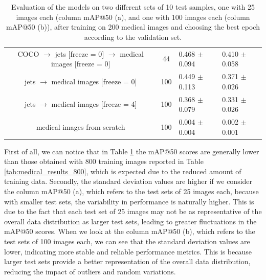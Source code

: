\begin{table}[!ht]
{\begin{tabular}{|ccll|}
    \multicolumn{1}{|c|}{{\color[HTML]{643403} COCO $\to$ jets {[}freeze = 0{]} $\to$ medical images {[}freeze = 0{]}}} & \multicolumn{1}{c|}{{\color[HTML]{643403} 44}}  & \multicolumn{1}{l|}{{\color[HTML]{643403} 0.468 $\pm$ 0.094}} & {\color[HTML]{643403} 0.410 $\pm$ 0.058} \\
    \multicolumn{1}{|c|}{{\color[HTML]{F171DF} jets $\to$ medical images {[}freeze = 0{]}}}                             & \multicolumn{1}{c|}{{\color[HTML]{F171DF} 100}} & \multicolumn{1}{l|}{{\color[HTML]{F171DF} 0.449 $\pm$ 0.113}} & {\color[HTML]{F171DF} 0.371 $\pm$ 0.026} \\
    \multicolumn{1}{|c|}{{\color[HTML]{9B9B9B} jets $\to$ medical images {[}freeze = 4{]}}}                             & \multicolumn{1}{c|}{{\color[HTML]{9B9B9B} 100}} & \multicolumn{1}{l|}{{\color[HTML]{9B9B9B} 0.368 $\pm$ 0.079}} & {\color[HTML]{9B9B9B} 0.331 $\pm$ 0.026} \\
    \multicolumn{1}{|c|}{{\color[HTML]{9CCB44} medical images from scratch}}                                            & \multicolumn{1}{c|}{{\color[HTML]{9CCB44} 100}} & \multicolumn{1}{l|}{{\color[HTML]{9CCB44} 0.004 $\pm$ 0.004}} & {\color[HTML]{9CCB44} 0.002 $\pm$ 0.001}                   \\ \hline
    \end{tabular}
    }
    \caption{Evaluation of the models on two different sets of 10 test samples, one with 25 images each (column mAP@50 (a), and one with 100 images each (column mAP@50 (b)), after training on 200 medical images and choosing the best epoch according to the validation set.}
    \label{tab:medical_results_200}
\end{table}
First of all, we can notice that in Table \ref{tab:medical_results_200} the mAP@50 scores are generally lower than those obtained with 800 training images reported in Table \ref{tab:medical_results_800}, which is expected due to the reduced amount of training data.
Secondly, the standard deviation values are higher if we consider the column mAP@50 (a), which refers to the test sets of 25 images each, because with smaller test sets, the variability in performance is naturally higher. This is due to the fact that each test set of 25 images may not be as representative of the overall data distribution as larger test sets, leading to greater fluctuations in the mAP@50 scores.
When we look at the column mAP@50 (b), which refers to the test sets of 100 images each, we can see that the standard deviation values are lower, indicating more stable and reliable performance metrics. This is because larger test sets provide a better representation of the overall data distribution, reducing the impact of outliers and random variations.
